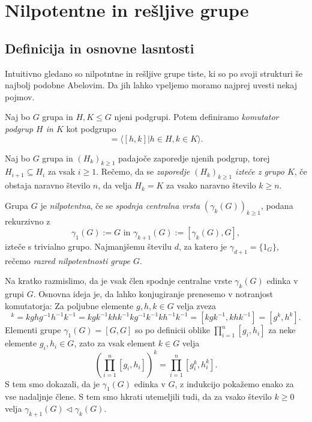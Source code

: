 \section{Nilpotentne in rešljive grupe}

\subsection{Definicija in osnovne lasntosti}

Intuitivno gledano so nilpotntne in rešljive grupe tiste, ki so po svoji strukturi še najbolj podobne Abelovim. Da jih lahko vpeljemo moramo najprej uvesti nekaj pojmov.
\begin{definicija}\label{def_komutator_grup}
    Naj bo $G$ grupa in $H, K \le G$ njeni podgrupi. Potem definiramo \emph{komutator podgrup $H$ in $K$} kot podgrupo \begin{equation*}
        [H, K]  = \langle [h, k] | h \in H, k \in K \rangle.
    \end{equation*}
\end{definicija}

\begin{definicija}
\label{def_iztek_zaporedja}
Naj bo $G$ grupa in $(H_k)_{k \ge 1}$ padajoče zaporedje njenih podgrup, torej $H_{i + 1} \subseteq H_{i}$ za vsak $i \ge 1$. 
Rečemo, da se \emph{zaporedje $(H_k)_{k \ge 1}$ izteče z grupo $K$}, če obstaja naravno število $n$, da velja $H_k = K$ za vsako naravno število $k \ge n$.
\end{definicija}

\begin{definicija}
\label{def_nilpotentna_grupa}
Grupa $G$ je \emph{nilpotentna}, če se \emph{spodnja centralna vrsta} $(\gamma_k(G))_{k \ge 1}$, podana rekurzivno z \begin{equation*}
\gamma_1(G) := G \text{ in } \gamma_{k +1}(G) := [\gamma_k(G), G],
\end{equation*}  
izteče s trivialno grupo. Najmanjšemu številu $d$, za katero je $\gamma_{d + 1} = \{ 1_G \}$, rečemo \emph{razred nilpotentnosti grupe $G$}.    
\end{definicija}

Na kratko razmislimo, da je vsak člen spodnje centralne vrste $\gamma_k(G)$ edinka v grupi $G$. Osnovna ideja je, da lahko konjugiranje prenesemo v notranjost komutatorja: Za poljubne elemente $g, h, k \in G$ velja zveza \begin{equation*}
    [g, h]^k = kghg^{-1}h^{-1}k^{-1} = kgk^{-1}khk^{-1}kg^{-1}k^{-1}kh^{-1}k^{-1} = [kgk^{-1}, khk^{-1}] = [g^k , h^k].
\end{equation*}
Elementi grupe $\gamma_1(G)  = [G , G]$ so po definicii oblike $\prod_{i = 1}^n [g_i, h_i]$ za neke elemente $g_i, h_i \in G$, zato za vsak element $k \in G$ velja \begin{equation*}
    \left( \prod_{i = 1}^n [g_i, h_i]\right)^k = \prod_{i = 1}^n [g_i^k, h_i^k]. 
\end{equation*}
S tem smo dokazali, da je $\gamma_1(G)$ edinka v $G$, z indukcijo pokažemo enako za vse nadaljnje člene. S tem smo hkrati utemeljili tudi, da za vsako število $k \ge 0$ velja $\gamma_{k+1}(G) \triangleleft \gamma_k(G)$.


